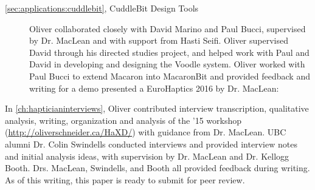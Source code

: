 \begin{description}


\item[\autoref{sec:applications:cuddlebit}, CuddleBit Design Tools] Oliver collaborated closely with David Marino and Paul Bucci, supervised by Dr. MacLean and with support from Hasti Seifi.
Oliver supervised David through his directed studies project, and helped work with Paul and David in developing and designing the Voodle system.
Oliver worked with Paul Bucci to extend Macaron into MacaronBit and provided feedback and writing for a demo presented a EuroHaptics 2016 by Dr. MacLean:


\end{description}

\noindent
In \autoref{ch:hapticianinterviews}, Oliver contributed interview transcription, qualitative analysis, writing, organization and analysis of the \haxd '15 workshop (\url{http://oliverschneider.ca/HaXD/}) with guidance from Dr. MacLean.
UBC alumni Dr. Colin Swindells conducted interviews and provided interview notes and initial analysis ideas, with supervision  by Dr. MacLean and Dr. Kellogg Booth.
Drs. MacLean, Swindells, and Booth all provided feedback during writing.
As of this writing, this paper is ready to submit for peer review.








